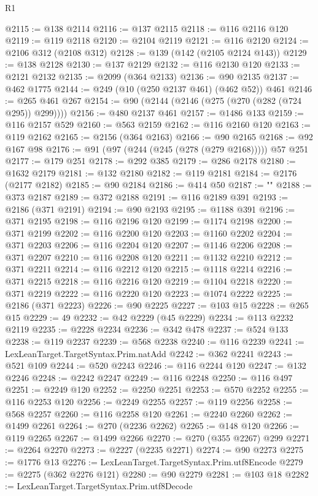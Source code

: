 \begin{lexlean}{R1}
\begin{coremodule}
@2115 := @138 @2114
@2116 := @137 @2115
@2118 := @116 @2116 @120
@2119 := @119 @2118
@2120 := @2104 @2119
@2121 := @116 @2120
@2124 := @2106 @312 (@2108 @312)
@2128 := @139 (@142 (@2105 @2124 @143))
@2129 := @138 @2128
@2130 := @137 @2129
@2132 := @116 @2130 @120
@2133 := @2121 @2132
@2135 := @2099 (@364 @2133)
@2136 := @90 @2135
@2137 := @462 @1775
@2144 := @249 (@10 (@250 @2137 @461) (@462 @52)) @461
@2146 := @265 @461 @267
@2154 := @90 (@2144 (@2146 (@275 (@270 (@282 (@724 @295)) @299))))
@2156 := @480 @2137 @461
@2157 := @1486 @133
@2159 := @116 @2157 @529
@2160 := @563 @2159
@2162 := @116 @2160 @120
@2163 := @119 @2162
@2165 := @2156 (@364 @2163)
@2166 := @90 @2165
@2168 := @92 @167 @98
@2176 := @91 (@97 (@244 (@245 (@278 (@279 @2168))))) @57 @251
@2177 := @179 @251
@2178 := @292 @385
@2179 := @286 @2178
@2180 := @1632 @2179
@2181 := @132 @2180
@2182 := @119 @2181
@2184 := @2176 (@2177 @2182)
@2185 := @90 @2184
@2186 := @414 @50
@2187 := ""
@2188 := @373 @2187
@2189 := @372 @2188
@2191 := @116 @2189 @391
@2193 := @2186 (@371 @2191)
@2194 := @90 @2193
@2195 := @1188 @391
@2196 := @371 @2195
@2198 := @116 @2196 @120
@2199 := @1174 @2198
@2200 := @371 @2199
@2202 := @116 @2200 @120
@2203 := @1160 @2202
@2204 := @371 @2203
@2206 := @116 @2204 @120
@2207 := @1146 @2206
@2208 := @371 @2207
@2210 := @116 @2208 @120
@2211 := @1132 @2210
@2212 := @371 @2211
@2214 := @116 @2212 @120
@2215 := @1118 @2214
@2216 := @371 @2215
@2218 := @116 @2216 @120
@2219 := @1104 @2218
@2220 := @371 @2219
@2222 := @116 @2220 @120
@2223 := @1074 @2222
@2225 := @2186 (@371 @2223)
@2226 := @90 @2225
@2227 := @103 @15
@2228 := @265 @15
@2229 := 49
@2232 := @42 @2229 (@45 @2229)
@2234 := @113 @2232 @2119
@2235 := @2228 @2234
@2236 := @342 @478
@2237 := @524 @133
@2238 := @119 @2237
@2239 := @568 @2238
@2240 := @116 @2239
@2241 := LexLeanTarget.TargetSyntax.Prim.natAdd
@2242 := @362 @2241
@2243 := @521 @109
@2244 := @520 @2243
@2246 := @116 @2244 @120
@2247 := @132 @2246
@2248 := @2242 @2247
@2249 := @116 @2248
@2250 := @116 @497
@2251 := @2249 @120
@2252 := @2250 @2251
@2253 := @570 @2252
@2255 := @116 @2253 @120
@2256 := @2249 @2255
@2257 := @119 @2256
@2258 := @568 @2257
@2260 := @116 @2258 @120
@2261 := @2240 @2260
@2262 := @1499 @2261
@2264 := @270 (@2236 @2262)
@2265 := @148 @120
@2266 := @119 @2265
@2267 := @1499 @2266
@2270 := @270 (@355 @2267) @299
@2271 := @2264 @2270
@2273 := @2227 (@2235 @2271)
@2274 := @90 @2273
@2275 := @1776 @13
@2276 := LexLeanTarget.TargetSyntax.Prim.utf8Encode
@2279 := @2275 (@362 @2276 @121)
@2280 := @90 @2279
@2281 := @103 @18
@2282 := LexLeanTarget.TargetSyntax.Prim.utf8Decode

\end{coremodule}
\end{lexlean}
